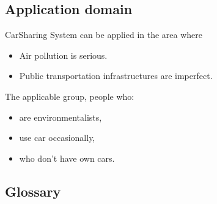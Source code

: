 \documentclass[12pt, letterpaper]{article}
\begin{document}
\subsection{Application domain}

CarSharing System can be applied in the area where
\begin{itemize}
	\item Air pollution is serious.
	\item Public transportation infrastructures are imperfect.
\end{itemize}
The applicable group, people who:
\begin{itemize}
	\item are environmentalists,
	\item use car occasionally,
	\item who don't have own cars.
\end{itemize}


\subsection{Glossary}
\end{document}
